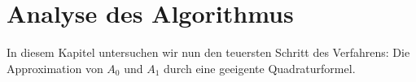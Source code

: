 \chapter{Analyse des Algorithmus}

In diesem Kapitel untersuchen wir nun den teuersten Schritt des Verfahrens:
Die Approximation von $A_0$ und $A_1$ durch eine geeigente Quadraturformel.



